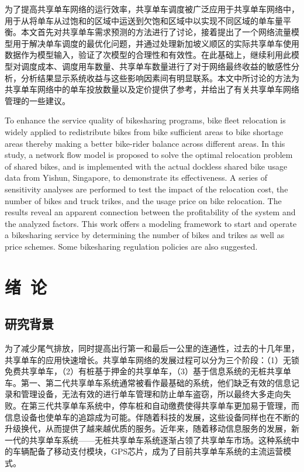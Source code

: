 \documentclass[]{tongjithesis}
\numberwithin{equation}{chapter}
\begin{document}
\begin{cabstract}
	为了提高共享单车网络的运行效率，共享单车调度被广泛应用于共享单车网络中，用于从将单车从过饱和的区域中运送到欠饱和区域中以实现不同区域的单车量平衡。本文首先对共享单车需求预测的方法进行了讨论，接着提出了一个网络流量模型用于解决单车调度的最优化问题，并通过处理新加坡义顺区的实际共享单车使用数据作为模型输入，验证了次模型的合理性和有效性。在此基础上，继续利用此模型对调度成本、调度用车数量、共享单车数量进行了对于网络最终收益的敏感性分析，分析结果显示系统收益与这些影响因素间有明显联系。本文中所讨论的方法为共享单车网络中的单车投放数量以及定价提供了参考，并给出了有关共享单车网络管理的一些建议。
\end{cabstract}

\begin{eabstract}
	To enhance the service quality of bikesharing programs, bike fleet relocation is widely applied to redistribute bikes from bike sufficient areas to bike shortage areas thereby making a better bike-rider balance across different areas. In this study, a network flow model is proposed to solve the optimal relocation problem of shared bikes, and is implemented with the actual dockless shared bike usage data from Yishun, Singapore, to demonstrate its effectiveness. A series of sensitivity analyses are performed to test the impact of the relocation cost, the number of bikes and truck trikes, and the usage price on bike relocation. The results reveal an apparent connection between the profitability of the system and the analyzed factors. This work offers a modeling framework to start and operate a bikesharing service by determining the number of bikes and trikes as well as price schemes. Some bikesharing regulation policies are also suggested.
\end{eabstract}

\toc

\mainmatter

\chapter{绪~论}
\section{研究背景}
为了减少尾气排放，同时提高出行第一和最后一公里的连通性，过去的十几年里，共享单车的应用快速增长。共享单车网络的发展过程可以分为三个阶段：（1）无锁免费共享单车，（2）有桩基于押金的共享单车，（3）基于信息系统的无桩共享单车\cite{demaio2009bike,shaheen2010bikesharing,fishman2016bikeshare}。第一、第二代共享单车系统通常被看作最基础的系统，他们缺乏有效的信息记录和管理设备，无法有效的进行单车管理和防止单车盗窃，所以最终大多走向失败。在第三代共享单车系统中，停车桩和自动缴费使得共享单车更加易于管理，而信息设备也使单车的追踪成为可能。伴随着科技的发展，这些设备同样也在不断的升级换代，从而提供了越来越优质的服务。近年来，随着移动信息服务的发展，新一代的共享单车系统——无桩共享单车系统逐渐占领了共享单车市场。这种系统中的车辆配备了移动支付模块，GPS芯片，成为了目前共享单车系统的主流运营模式。
\end{document}
